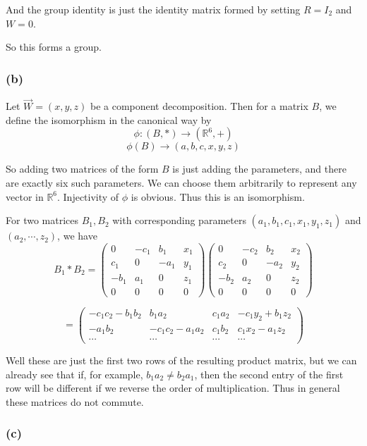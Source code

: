 \documentclass{article}
\begin{document}
And the group identity is just the identity matrix formed by setting $R = I_2$ and $W = 0$. 

So this forms a group.

\subsubsection{(b)} 

Let $\vec{W} = (x,y,z)$ be a component decomposition. Then for a matrix $B$, we define the isomorphism  in the canonical way by 
\[ \phi : (B, *) \longrightarrow (\mathbb{R}^6, +) \]
\[ \phi(B) \longrightarrow (a,b,c,x,y,z) \]

So adding two matrices of the form $B$ is just adding the parameters, and there are exactly six such parameters. We can choose them arbitrarily to represent any vector in $\mathbb{R}^6$. Injectivity of $\phi$ is obvious. Thus this is an isomorphism. 

For two matrices $B_1, B_2$ with corresponding parameters $(a_1,b_1,c_1,x_1,y_1,z_1)$ and $(a_2,\cdots ,z_2)$, we have
\[ B_1 * B_2 = \left( \begin{array}{cccc} 0 & -c_1 & b_1 & x_1 \\ c_1 & 0 & -a_1 & y_1 \\ -b_1 & a_1 & 0 & z_1 \\ 0 & 0 & 0 & 0 \end{array}\right) \left( \begin{array}{cccc} 0 & -c_2 & b_2 & x_2 \\ c_2 & 0 & -a_2 & y_2 \\ -b_2 & a_2 & 0 & z_2 \\ 0 & 0 & 0 & 0 \end{array}\right)\]

\[ = \left( \begin{array}{cccc} -c_1 c_2 - b_1 b_2 & b_1 a_2 & c_1 a_2 & -c_1 y_2 + b_1 z_2 \\ -a_1 b_2 & -c_1 c_2 - a_1 a_2 & c_1 b_2 & c_1 x_2 - a_1 z_2 \\ \cdots & \cdots & \cdots & \cdots \end{array}\right)\]

Well these are just the first two rows of the resulting product matrix, but we can already see that if, for example, $b_1 a_2 \neq b_2 a_1$, then the second entry of the first row will be different if we reverse the order of multiplication. Thus in general these matrices do not commute. 

\subsubsection{(c)} 
\end{document}
